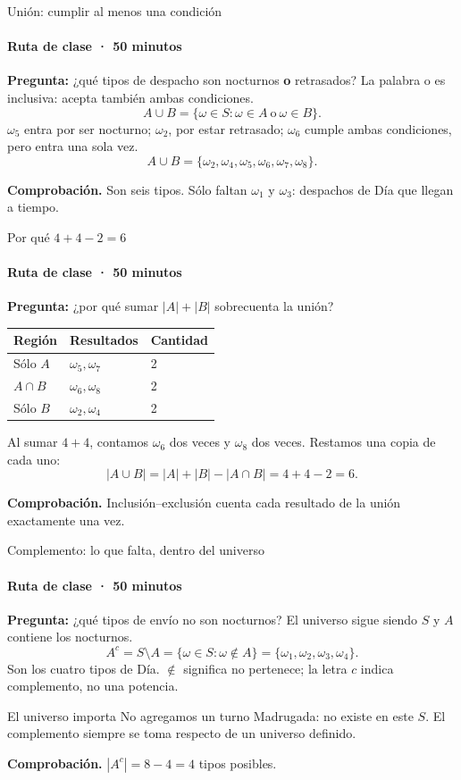 \documentclass[aspectratio=169,11pt,spanish]{beamer}
\newcommand{\verifica}[1]{\par\smallskip\textbf{Comprobación.} #1\par}
\begin{document}
\begin{frame}{Unión: cumplir al menos una condición}
\framesubtitle{Ruta de clase · 50 minutos}
\textbf{Pregunta:} ¿qué tipos de despacho son nocturnos \textbf{o} retrasados?
La palabra o es inclusiva: acepta también ambas condiciones.
\[
A\cup B=\{\omega\in S:\omega\in A\ \text{o}\ \omega\in B\}.
\]
$\omega_5$ entra por ser nocturno; $\omega_2$, por estar retrasado;
$\omega_6$ cumple ambas condiciones, pero entra una sola vez.
\[
A\cup B=\{\omega_2,\omega_4,\omega_5,\omega_6,\omega_7,\omega_8\}.
\]
\verifica{Son seis tipos. Sólo faltan $\omega_1$ y $\omega_3$: despachos de Día que llegan a tiempo.}
\end{frame}

\begin{frame}{Por qué $4 + 4 - 2 = 6$}
\framesubtitle{Ruta de clase · 50 minutos}
\textbf{Pregunta:} ¿por qué sumar $|A|+|B|$ sobrecuenta la unión?
\begin{center}
\begin{tabular}{lll}
\toprule Región & Resultados & Cantidad\\ \midrule
Sólo $A$ & $\omega_5,\omega_7$ & 2\\
$A\cap B$ & $\omega_6,\omega_8$ & 2\\
Sólo $B$ & $\omega_2,\omega_4$ & 2\\ \bottomrule
\end{tabular}
\end{center}
Al sumar $4+4$, contamos $\omega_6$ dos veces y $\omega_8$ dos veces.
Restamos una copia de cada uno:
\[
|A\cup B|=|A|+|B|-|A\cap B|=4+4-2=6.
\]
\verifica{Inclusión--exclusión cuenta cada resultado de la unión exactamente una vez.}
\end{frame}

\begin{frame}{Complemento: lo que falta, dentro del universo}
\framesubtitle{Ruta de clase · 50 minutos}
\textbf{Pregunta:} ¿qué tipos de envío no son nocturnos?
El universo sigue siendo $S$ y $A$ contiene los nocturnos.
\[
A^c=S\setminus A=\{\omega\in S:\omega\notin A\}
=\{\omega_1,\omega_2,\omega_3,\omega_4\}.
\]
Son los cuatro tipos de Día. $\notin$ significa no pertenece;
la letra $c$ indica complemento, no una potencia.
\begin{alertblock}{El universo importa}
No agregamos un turno Madrugada: no existe en este $S$. El complemento siempre se toma respecto de un universo definido.
\end{alertblock}
\verifica{$|A^c|=8-4=4$ tipos posibles.}
\end{frame}
\end{document}
